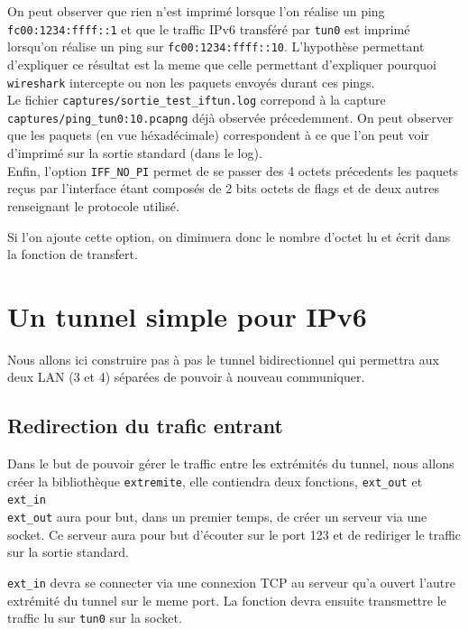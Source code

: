 \documentclass[a4paper, 10pt]{article}
\begin{document}
      On peut observer que rien n'est imprimé lorsque l'on réalise un ping
      \verb+fc00:1234:ffff::1+ et que le traffic IPv6 transféré par \verb+tun0+
      est imprimé lorsqu'on réalise un ping sur \verb+fc00:1234:ffff::10+.
      L'hypothèse permettant d'expliquer ce résultat est la meme que celle
      permettant d'expliquer pourquoi \verb+wireshark+ intercepte ou non les
      paquets envoyés durant ces pings. \\

      Le fichier \verb+captures/sortie_test_iftun.log+ correpond à la capture
      \verb+captures/ping_tun0:10.pcapng+ déjà observée précedemment. On peut
      observer que les paquets (en vue héxadécimale) correspondent à ce que l'on
      peut voir d'imprimé sur la sortie standard (dans le log). \\

      Enfin, l'option \verb+IFF_NO_PI+ permet de se passer des 4 octets
      précedents les paquets reçus par l'interface étant composés de 2 bits
      octets de flags et de deux autres renseignant le protocole utilisé.

      Si l'on ajoute cette option, on diminuera donc le nombre d'octet lu et
      écrit dans la fonction de transfert.

  \section{Un tunnel simple pour IPv6}
    Nous allons ici construire pas à pas le tunnel bidirectionnel qui permettra
    aux deux LAN (3 et 4) séparées de pouvoir à nouveau communiquer.

    \subsection{Redirection du trafic entrant}
      Dans le but de pouvoir gérer le traffic entre les extrémités du tunnel,
      nous allons créer la bibliothèque \verb+extremite+, elle contiendra deux
      fonctions, \verb+ext_out+ et \verb+ext_in+ \\

      \verb+ext_out+ aura pour but, dans un premier temps, de créer un serveur
      via une socket. Ce serveur aura pour but d'écouter sur le port 123 et de
      rediriger le traffic sur la sortie standard.

      \verb+ext_in+ devra se connecter via une connexion TCP au serveur qu'a
      ouvert l'autre extrémité du tunnel sur le meme port. La fonction devra
      ensuite transmettre le traffic lu sur \verb+tun0+ sur la socket. \\
\end{document}
